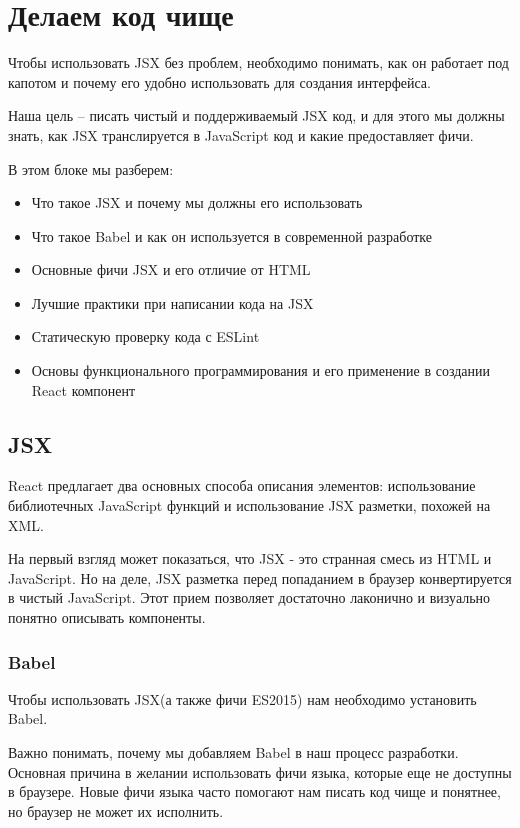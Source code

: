 \chapter{Делаем код чище}

Чтобы использовать JSX без проблем, необходимо понимать, как он работает под капотом и почему его удобно использовать для создания интерфейса.

Наша цель -- писать чистый и поддерживаемый JSX код, и для этого мы должны знать, как JSX транслируется в JavaScript код и какие предоставляет фичи.

В этом блоке мы разберем:

\begin{itemize}
  \item Что такое JSX и почему мы должны его использовать
  \item Что такое Babel и как он используется в современной разработке
  \item Основные фичи JSX и его отличие от HTML
  \item Лучшие практики при написании кода на JSX
  \item Статическую проверку кода с ESLint 
  \item Основы функционального программирования и его применение в создании React компонент
\end{itemize}


\section{JSX}

React предлагает два основных способа описания элементов: использование библиотечных JavaScript функций и использование JSX разметки, похожей на XML. 

На первый взгляд может показаться, что JSX - это странная смесь из HTML и JavaScript. Но на деле, JSX разметка перед попаданием в браузер конвертируется в чистый JavaScript. Этот прием позволяет достаточно лаконично и визуально понятно описывать компоненты.

\subsection{Babel}

Чтобы использовать JSX(а также фичи ES2015) нам необходимо установить Babel. 

Важно понимать, почему мы добавляем Babel в наш процесс разработки. Основная причина в желании использовать фичи языка, которые еще не доступны в браузере. Новые фичи языка часто помогают нам писать код чище и понятнее, но браузер не может их исполнить.


